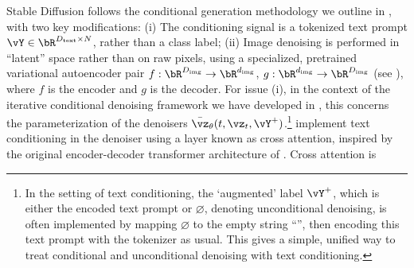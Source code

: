\documentclass[../../book-main_zh.tex]{subfiles}
\begin{document}
Stable Diffusion follows the conditional generation methodology we outline in
, with two key modifications: (i) The conditioning signal is a
tokenized text prompt $\vY \in
\bR^{D_{\mathrm{text}} \times N}$, rather than a class label; (ii) Image denoising is
performed in ``latent'' space rather than on raw pixels, using a specialized,
pretrained variational autoencoder pair $f : \bR^{D_{\mathrm{img}}} \to
\bR^{d_{\mathrm{img}}}$, $g : \bR^{d_{\mathrm{img}}} \to
\bR^{D_{\mathrm{img}}}$ (see ), where $f$
is the encoder and $g$ is the decoder.
For issue (i), in the context of the iterative conditional denoising framework we have
developed in , this concerns the parameterization of the denoisers
$\bar{\vz}_{\theta}(t, \vz_t, \vY^+)$.\footnote{In the setting of text
    conditioning, the `augmented' label $\vY^+$, which is either the
    encoded text
    prompt or $\varnothing$, denoting unconditional denoising, is
    often implemented
    by mapping $\varnothing$ to the empty string ``'', then encoding this text
    prompt with the tokenizer as usual. This gives a simple, unified
    way to treat
conditional and unconditional denoising with text conditioning.}
\textcite{rombach2022high} implement text conditioning in the denoiser using
a layer known as cross attention, inspired by the original encoder-decoder
transformer architecture of \textcite{vaswani2017attention}. Cross attention is
\end{document}
